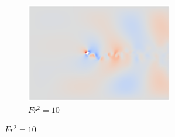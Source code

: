 \begin{figure}
\begin{subfigure}[b]{0.32\textwidth}
        \includegraphics[width=\textwidth]{images/spinning_ellipse/ar1p5fr3.png}
        \caption{$Fr^2 = 10$}
        \label{fig:ar1p5fr3}
    \end{subfigure}
    

\end{figure}
